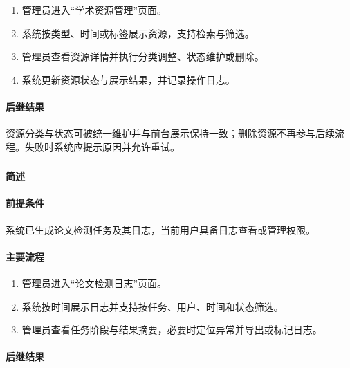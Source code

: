 \begin{enumerate}
    \item 管理员进入“学术资源管理”页面。
    \item 系统按类型、时间或标签展示资源，支持检索与筛选。
    \item 管理员查看资源详情并执行分类调整、状态维护或删除。
    \item 系统更新资源状态与展示结果，并记录操作日志。
\end{enumerate}

\paragraph*{后继结果}

资源分类与状态可被统一维护并与前台展示保持一致；删除资源不再参与后续流程。失败时系统应提示原因并允许重试。

\subsubsection{}

\paragraph*{简述}


\paragraph*{前提条件}

系统已生成论文检测任务及其日志，当前用户具备日志查看或管理权限。

\paragraph*{主要流程}

\begin{enumerate}
    \item 管理员进入“论文检测日志”页面。
    \item 系统按时间展示日志并支持按任务、用户、时间和状态筛选。
    \item 管理员查看任务阶段与结果摘要，必要时定位异常并导出或标记日志。
\end{enumerate}

\paragraph*{后继结果}

